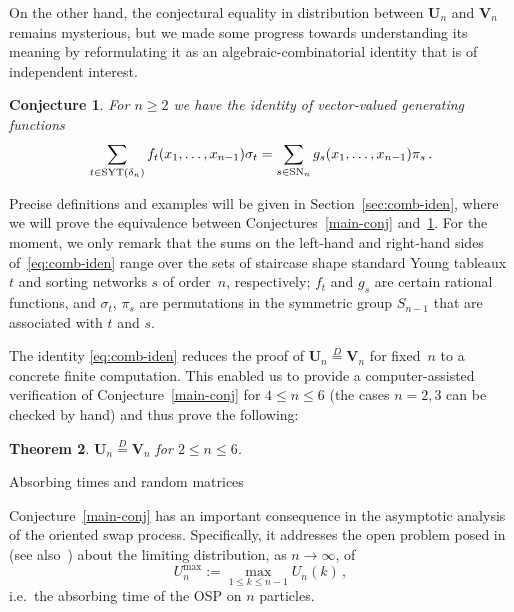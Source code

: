 \documentclass[a4paper,reqno,12pt]{amsart}
\makeatletter
\theoremstyle{plain}
\newtheorem{thm}{Theorem}[section]
\newtheorem{conj}[thm]{Conjecture}
\theoremstyle{definition}
\renewcommand\subsection{\@startsection{subsection}{2}%
  \z@{.5\linespacing\@plus.7\linespacing}{-.5em}%
  {\bfseries\scshape}}
\newcommand{\sym}{S}
\newcommand{\syt}{\textnormal{SYT}}
\newcommand{\staircase}{\delta}
\newcommand{\sort}{\textnormal{SN}}
\newcommand{\1}{\mathbbm{1}}
\makeatother
\begin{document}
On the other hand, the conjectural equality in distribution between $\bm{U}_n$ and $\bm{V}_n$ remains mysterious, but we made some progress towards understanding its meaning by reformulating it as an algebraic-combinatorial identity that is of independent interest.
\begin{conj} 
\label{main-conj-reformulated}
For $n\ge 2$ we have the identity of vector-valued generating functions
\begin{equation}
\label{eq:comb-iden}
\sum_{t\in \syt(\staircase_n)} f_t(x_1,\ldots,x_{n-1}) \sigma_t
= \sum_{s\in \sort_n} 
g_s(x_1,\ldots,x_{n-1}) \pi_s \, .
\end{equation}
\end{conj}
Precise definitions and examples will be given in Section~\ref{sec:comb-iden}, where we will prove the equivalence between Conjectures~\ref{main-conj} and~\ref{main-conj-reformulated}.
For the moment, we only remark that the sums on the left-hand and right-hand sides of~\eqref{eq:comb-iden} range over the sets of staircase shape standard Young tableaux $t$ and sorting networks $s$ of order~$n$, respectively; $f_t$ and $g_s$ are certain rational functions, and $\sigma_t$, $\pi_s$ are permutations in the symmetric group $\sym_{n-1}$ that are associated with $t$ and $s$. 

The identity \eqref{eq:comb-iden} reduces the proof of $\bm{U}_n \overset{D}{=} \bm{V}_n$ for fixed~$n$ to a concrete finite computation.
This enabled us to provide a computer-assisted verification of Conjecture~\ref{main-conj} for $4\le n\le 6$ (the cases $n=2,3$ can be checked by hand) and thus prove the following:
\begin{thm}
\label{thm:main-thm2}
$\bm{U}_n \overset{D}{=} \bm{V}_n$  for  $2\le n\le 6$.
\end{thm}


\subsection{Absorbing times and random matrices}
\label{subsec:absTimes}

Conjecture~\ref{main-conj} has an important consequence in the asymptotic analysis of the oriented swap process.
Specifically, it addresses the open problem posed in~\cite{angelHolroydRomik09} (see also~\cite[Ex.~5.22(e), p.~331]{romik15}) about the limiting distribution, as $n\to\infty$, of
\begin{equation}
\label{eq:absTimeOSP}
U^{\max}_n := \max_{1\le k\le n-1} U_n(k) \, ,
\end{equation}
i.e.\ the absorbing time of the OSP on $n$ particles.
\end{document}
